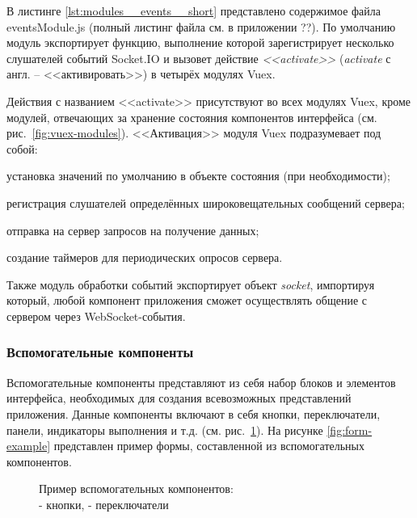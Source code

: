 В листинге \ref{lst:modules__events__short} представлено содержимое файла eventsModule.js (полный листинг файла см. в приложении ??). По умолчанию модуль экспортирует функцию, выполнение которой зарегистрирует несколько слушателей событий Socket.IO и вызовет действие \emph{<<activate>>} (\emph{activate} с англ. -- <<активировать>>) в четырёх модулях Vuex.

Действия с названием <<activate>> присутствуют во всех модулях Vuex, кроме модулей, отвечающих за хранение состояния компонентов интерфейса (см. рис.~\ref{fig:vuex-modules}). <<Активация>> модуля Vuex подразумевает под собой:
\begin{dashitemize}
  \item установка значений по умолчанию в объекте состояния (при необходимости);
  \item регистрация слушателей определённых широковещательных сообщений сервера;
  \item отправка на сервер запросов на получение данных;
  \item создание таймеров для периодических опросов сервера.
\end{dashitemize}



Также модуль обработки событий экспортирует объект \emph{socket}, импортируя который, любой компонент приложения сможет осуществлять общение с сервером через WebSocket-события.


\subsubsection{Вспомогательные компоненты}

Вспомогательные компоненты представляют из себя набор блоков и элементов интерфейса, необходимых для создания всевозможных представлений приложения. Данные компоненты включают в себя кнопки, переключатели, панели, индикаторы выполнения и т.д. (см. рис.~\ref{fig:common-components}). На рисунке \ref{fig:form-example} представлен пример формы, составленной из вспомогательных компонентов.

\begin{figure}[h!]
  \centering
  \setlength{\fboxsep}{5pt}
  \qquad
  \vspace*{6pt}
  \caption{
    Пример вспомогательных компонентов:\\
    \protect{} - кнопки,
    \protect{} - переключатели
  }
  \label{fig:common-components}
\end{figure}

